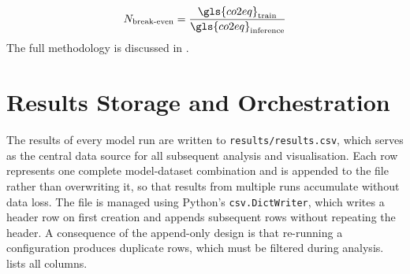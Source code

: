 \begin{equation}
  \label{eq:N_Breakeven}
  N_{\text{break-even}} = \frac{\gls{co2eq}_{\text{train}}}{\gls{co2eq}_{\text{inference}}}
\end{equation} 
The full methodology is discussed in .

\section{Results Storage and Orchestration}
\label{implementation_results}

The results of every model run are written to \texttt{results/results.csv}, which serves as the central data source for all subsequent analysis and visualisation. Each row represents one complete model-dataset combination and is appended to the file rather than overwriting it, so that results from multiple runs accumulate without data loss. The file is managed using Python's \texttt{csv.DictWriter}, which writes a header row on first creation and appends subsequent rows without repeating the header. A consequence of the append-only design is that re-running a configuration produces duplicate rows, which must be filtered during analysis.  lists all columns.

